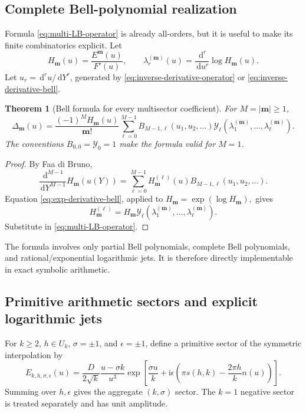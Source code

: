 \documentclass[11pt]{article}
\numberwithin{equation}{section}
\theoremstyle{mainthm}
\newtheorem{theorem}{Theorem}[section]
\theoremstyle{defstyle}
\theoremstyle{remark}
\newcommand{\ii}{\mathrm i}
\newcommand{\dd}{\,\mathrm d}
\newcommand{\Ybell}{\mathcal Y}
\begin{document}
\subsection{Complete Bell-polynomial realization}

Formula \eqref{eq:multi-LB-operator} is already all-orders, but it is useful to make its finite combinatorics explicit.  Let
\begin{equation}\label{eq:Hm-lambda}
 H_{\bm m}(u)=\frac{E^{\bm m}(u)}{F'(u)},
 \qquad
 \lambda_r^{(\bm m)}(u)=\frac{\dd^r}{\dd u^r}\log H_{\bm m}(u).
\end{equation}
Let \(u_r=\dd^ru/\dd Y^r\), generated by \eqref{eq:inverse-derivative-operator} or \eqref{eq:inverse-derivative-bell}.

\begin{theorem}[Bell formula for every multisector coefficient]\label{thm:multi-Bell}
For \(M=|\bm m|\ge1\),
\begin{equation}\label{eq:multi-Bell}
 \boxed{
 \Delta_{\bm m}(u)=
 \frac{(-1)^M H_{\bm m}(u)}{\bm m!}
 \sum_{\ell=0}^{M-1}
 B_{M-1,\ell}(u_1,u_2,\ldots)
 \Ybell_\ell\!\left(
 \lambda_1^{(\bm m)},\ldots,\lambda_\ell^{(\bm m)}
 \right).}
\end{equation}
The conventions \(B_{0,0}=\Ybell_0=1\) make the formula valid for \(M=1\).
\end{theorem}

\begin{proof}
By Faa di Bruno,
\[
 \frac{\dd^{M-1}}{\dd Y^{M-1}}H_{\bm m}(u(Y))
 =\sum_{\ell=0}^{M-1}H_{\bm m}^{(\ell)}(u)
 B_{M-1,\ell}(u_1,u_2,\ldots).
\]
Equation \eqref{eq:exp-derivative-bell}, applied to
\(
 H_{\bm m}=\exp(\log H_{\bm m}),
\)
gives
\[
 H_{\bm m}^{(\ell)}=H_{\bm m}
 \Ybell_\ell(\lambda_1^{(\bm m)},\ldots,\lambda_\ell^{(\bm m)}).
\]
Substitute in \eqref{eq:multi-LB-operator}.
\end{proof}

The formula involves only partial Bell polynomials, complete Bell polynomials, and rational/exponential logarithmic jets.  It is therefore directly implementable in exact symbolic arithmetic.

\subsection{Primitive arithmetic sectors and explicit logarithmic jets}

For \(k\ge2\), \(h\in U_k\), \(\sigma=\pm1\), and \(\epsilon=\pm1\), define a primitive sector of the symmetric interpolation by
\begin{equation}\label{eq:primitive-E}
 E_{k,h,\sigma,\epsilon}(u)=
 \frac{D}{2\sqrt{k}}\frac{u-\sigma k}{u^3}
 \exp\!\left[
 \frac{\sigma u}{k}
 +\ii\epsilon\left(\pi s(h,k)-\frac{2\pi h}{k}n(u)\right)
 \right].
\end{equation}
Summing over \(h,\epsilon\) gives the aggregate \((k,\sigma)\) sector.  The \(k=1\) negative sector is treated separately and has unit amplitude.
\end{document}
